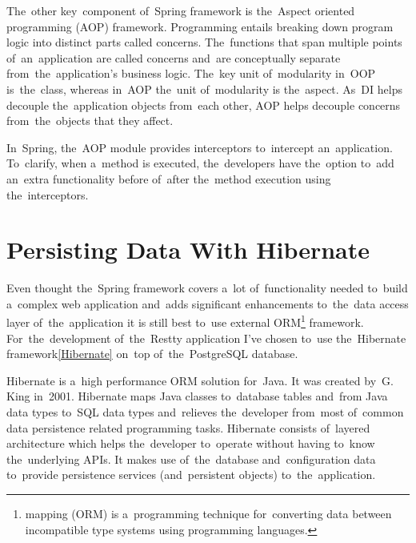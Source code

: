 The~other key~component of~Spring framework is the~Aspect oriented programming
(AOP) framework.  Programming entails breaking down program
logic into distinct parts called  concerns. The~functions that
span multiple points of~an~application are called  concerns
and~are conceptually separate from~the~application's business logic. The~key
unit of~modularity in~OOP is~the~class, whereas in~AOP the~unit of~modularity
is the~aspect. As~DI helps decouple the~application objects from~each other, AOP
helps decouple  concerns from~the~objects that they affect.

In~Spring, the~AOP module provides interceptors to~intercept an~application.
To~clarify, when a~method is executed, the~developers have the~option to~add
an~extra functionality before of~after the~method execution using
the~interceptors.

\section{Persisting Data With Hibernate}
Even thought the~Spring framework covers a~lot of~functionality needed to~build
a~complex web application and~adds significant enhancements to~the~data access
layer of~the~application it is still best to~use external
ORM\footnote{ mapping (ORM) is a~programming technique
for~converting data between incompatible type systems using
 programming languages.} framework. For~the~development
of~the~Restty application I've chosen to~use the~Hibernate
framework\ref{Hibernate} on~top of~the~PostgreSQL database. 

Hibernate is a~high performance ORM solution for~Java. It was created by~G.
King in~2001. Hibernate maps Java classes to~database tables and~from Java data
types to~SQL data types and~relieves the~developer from~most of~common data
persistence related programming tasks. Hibernate consists of~layered
architecture which helps the~developer to~operate without having to~know
the~underlying APIs. It makes use of~the~database and~configuration data
to~provide persistence services (and~persistent objects) to~the~application.

